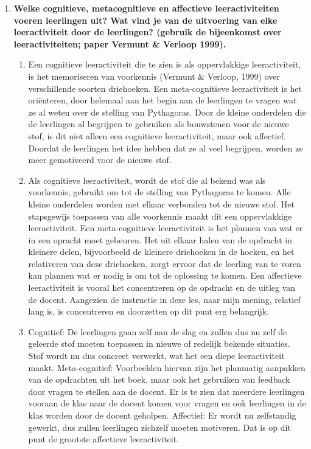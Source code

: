 \documentclass{article}
\begin{document}
            \begin{enumerate}[label=(\alph*)]
                \item \textbf{Welke cognitieve, metacognitieve en affectieve leeractiviteiten voeren leerlingen uit? Wat vind je van de uitvoering van elke leeractiviteit door de leerlingen? (gebruik de bijeenkomst over leeractiviteiten; paper Vermunt \& Verloop 1999).} \\
                    \begin{enumerate}[label=\arabic*.]
                        \item Een cognitieve leeractiviteit die te zien is als oppervlakkige leeractiviteit, is het memoriseren van voorkennis (Vermunt$\And$Verloop, 1999) over verschillende soorten driehoeken. Een meta-cognitieve leeractiviteit is het oriënteren, door helemaal aan het begin aan de leerlingen te vragen wat ze al weten over de stelling van Pythagoras. Door de kleine onderdelen die de leerlingen al begrijpen te gebruiken als bouwstenen voor de nieuwe stof, is dit niet alleen een cognitieve leeractiviteit, maar ook affectief. Doordat de leerlingen het idee hebben dat ze al veel begrijpen, worden ze meer gemotiveerd voor de nieuwe stof.
                        \item Als cognitieve leeractiviteit, wordt de stof die al bekend was als voorkennis, gebruikt om tot de stelling van Pythagoras te komen. Alle kleine onderdelen worden met elkaar verbonden tot de nieuwe stof. Het stapsgewijs toepassen van alle voorkennis maakt dit een oppervlakkige leeractiviteit. Een meta-cognitieve leeractiviteit is het plannen van wat er in een opracht moet gebeuren. Het uit elkaar halen van de opdracht in kleinere delen, bijvoorbeeld de kleinere driehoeken in de hoeken, en het relativeren van deze driehoeken, zorgt ervoor dat de leerling van te voren kan plannen wat er nodig is om tot de oplossing te komen. Een affectieve leeractiviteit is vooral het concentreren op de opdracht en de uitleg van de docent. Aangezien de instructie in deze les, naar mijn mening, relatief lang is, is concentreren en doorzetten op dit punt erg belangrijk.
                        \item Cognitief: De leerlingen gaan zelf aan de slag en zullen dus nu zelf de geleerde stof moeten toepassen in nieuwe of redelijk bekende situaties. Stof wordt nu dus concreet verwerkt, wat het een diepe leeractiviteit maakt. Meta-cognitief: Voorbeelden hiervan zijn het planmatig aanpakken van de opdrachten uit het boek, maar ook het gebruiken van feedback door vragen te stellen aan de docent. Er is te zien dat meerdere leerlingen vooraan de klas naar de docent komen voor vragen en ook leerlingen in de klas worden door de docent geholpen. Affectief: Er wordt nu zelfstandig gewerkt, dus zullen leerlingen zichzelf moeten motiveren. Dat is op dit punt de grootste affectieve leeractiviteit. 

\end{enumerate}
\end{enumerate}
\end{document}

